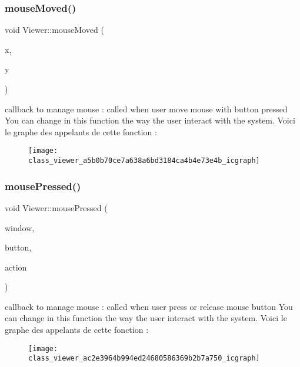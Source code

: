 \mbox{\label{class_viewer_a5b0b70ce7a638a6bd3184ca4b4e73e4b}} 
\subsubsection{\texorpdfstring{mouse\+Moved()}{mouseMoved()}}
{\footnotesize\ttfamily void Viewer\+::mouse\+Moved (\begin{DoxyParamCaption}\item[{int}]{x,  }\item[{int}]{y }\end{DoxyParamCaption})}

callback to manage mouse \+: called when user move mouse with button pressed You can change in this function the way the user interact with the system. Voici le graphe des appelants de cette fonction \+:\nopagebreak
\begin{figure}[H]
\begin{center}
\leavevmode
\texttt{[image: class\_viewer\_a5b0b70ce7a638a6bd3184ca4b4e73e4b\_icgraph]}
\end{center}
\end{figure}
\mbox{\label{class_viewer_ac2e3964b994ed24680586369b2b7a750}} 
\subsubsection{\texorpdfstring{mouse\+Pressed()}{mousePressed()}}
{\footnotesize\ttfamily void Viewer\+::mouse\+Pressed (\begin{DoxyParamCaption}\item[{G\+L\+F\+Wwindow $\ast$}]{window,  }\item[{int}]{button,  }\item[{int}]{action }\end{DoxyParamCaption})}

callback to manage mouse \+: called when user press or release mouse button You can change in this function the way the user interact with the system. Voici le graphe des appelants de cette fonction \+:\nopagebreak
\begin{figure}[H]
\begin{center}
\leavevmode
\texttt{[image: class\_viewer\_ac2e3964b994ed24680586369b2b7a750\_icgraph]}
\end{center}
\end{figure}
\mbox{\label{class_viewer_abd042d0aa5ae88ef0261d83c15ce8d4b}} 
